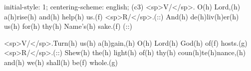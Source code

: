initial-style: 1;
centering-scheme: english;
(c3) <sp>V/</sp>. O(h) Lord,(h) a(h)rise(h) and(h) help(h) us.(f) <sp>R/</sp>.(::) And(h) de(h)liv(h)er(h) us(h) for(h) thy(h) Name's(h) sake.(f) (::)

<sp>V/</sp>.Turn(h) us(h) a(h)gain,(h) O(h) Lord(h) God(h) of(f) hosts.(g) <sp>R/</sp>.(::) Shew(h) the(h) light(h) of(h) thy(h) coun(h)te(h)nance,(h) and(h) we(h) shall(h) be(f) whole.(g)
